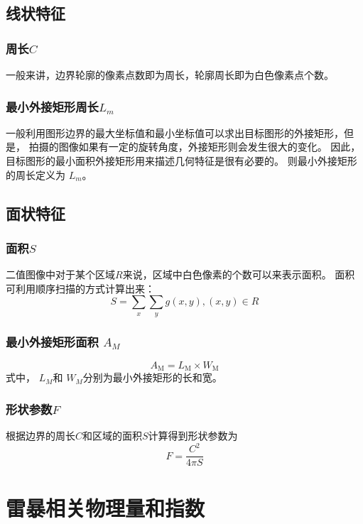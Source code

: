 \subsection{线状特征}
\subsubsection{周长$C$}
一般来讲，边界轮廓的像素点数即为周长，轮廓周长即为白色像素点个数。

\subsubsection{最小外接矩形周长$L_m$}
一般利用图形边界的最大坐标值和最小坐标值可以求出目标图形的外接矩形，但是，
拍摄的图像如果有一定的旋转角度，外接矩形则会发生很大的变化。
因此，目标图形的最小面积外接矩形用来描述几何特征是很有必要的。
则最小外接矩形的周长定义为 $L_m$。

\subsection{面状特征}
\subsubsection{面积$S$}
二值图像中对于某个区域$R$来说，区域中白色像素的个数可以来表示面积。
面积可利用顺序扫描的方式计算出来：
\begin{equation}
    S=\sum_{x} \sum_{y} g(x, y),(x, y) \in R
\end{equation}

\subsubsection{最小外接矩形面积 $A_M$}
\begin{equation}
    A_{\mathrm{M}}=L_{\mathrm{M}} \times W_{\mathrm{M}}
\end{equation}
式中， $L_M$和 $W_M$分别为最小外接矩形的长和宽。 

\subsubsection{形状参数$F$}
根据边界的周长$C$和区域的面积$S$计算得到形状参数为
\begin{equation}
    F=\frac{C^{2}}{4 \pi S}
\end{equation}



\section{雷暴相关物理量和指数}


